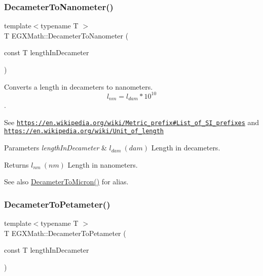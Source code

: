 \subsubsection{\texorpdfstring{Decameter\+To\+Nanometer()}{DecameterToNanometer()}}
{\footnotesize\ttfamily template$<$typename T $>$ \\
T E\+G\+X\+Math\+::\+Decameter\+To\+Nanometer (\begin{DoxyParamCaption}\item[{const T}]{length\+In\+Decameter }\end{DoxyParamCaption})}



Converts a length in decameters to nanometers. \[ l_{nm}=l_{dam} * 10^{10} \]. 

See \href{https://en.wikipedia.org/wiki/Metric_prefix#List_of_SI_prefixes}{\tt https\+://en.\+wikipedia.\+org/wiki/\+Metric\+\_\+prefix\#\+List\+\_\+of\+\_\+\+S\+I\+\_\+prefixes} and \href{https://en.wikipedia.org/wiki/Unit_of_length}{\tt https\+://en.\+wikipedia.\+org/wiki/\+Unit\+\_\+of\+\_\+length} 
\begin{DoxyParams}{Parameters}
{\em length\+In\+Decameter} & $ l_{dam}\ (dam)$ Length in decameters. \\
\hline
\end{DoxyParams}
\begin{DoxyReturn}{Returns}
$ l_{nm}\ (nm)$ Length in nanometers. 
\end{DoxyReturn}
\begin{DoxySeeAlso}{See also}
\mbox{\hyperlink{group___e_g_x_math-_conversions-_length_conversions-_decameter-_non-_s_i_gaf3c7befd051b823dc17aca5318cae689}{Decameter\+To\+Micron()}} for alias. 
\end{DoxySeeAlso}
\mbox{\label{group___e_g_x_math-_conversions-_length_conversions-_decameter-_s_i_ga0475fbe33c57dc772e3121f776d82fd0}} 
\subsubsection{\texorpdfstring{Decameter\+To\+Petameter()}{DecameterToPetameter()}}
{\footnotesize\ttfamily template$<$typename T $>$ \\
T E\+G\+X\+Math\+::\+Decameter\+To\+Petameter (\begin{DoxyParamCaption}\item[{const T}]{length\+In\+Decameter }\end{DoxyParamCaption})}



